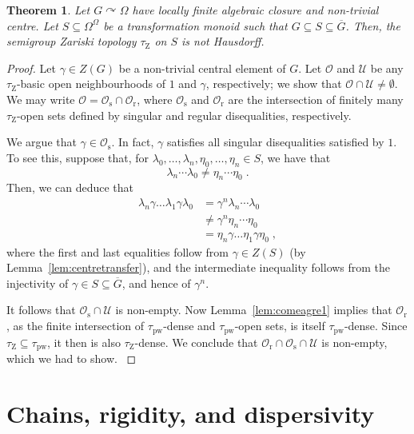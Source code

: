 \documentclass{article}
\newtheorem{theorem}{Theorem}[section]
\theoremstyle{remark}
\theoremstyle{definition}
\def\acts{\curvearrowright}
\def\G{\overline{G}}
\newcommand{\pw}[0]{\tau_{\mathrm{pw}}}
\newcommand{\zar}[0]{\tau_{\mathrm{Z}}}
\begin{document}
{{{{{\begin{theorem}\label{thm:zar} Let $G\acts \Omega$ have locally finite algebraic closure and non-trivial centre. Let $S\subseteq \Omega^\Omega$ be a transformation monoid such that $G\subseteq S\subseteq \G$. Then, the semigroup Zariski topology $\zar$ on $S$ is not Hausdorff.
\end{theorem}
\begin{proof} {Let $\gamma \in Z(G)$ be a non-trivial central element of $G$. Let $\mathcal{O}$ and $\mathcal{U}$ be any $\zar$-basic open neighbourhoods of $1$ and $\gamma$, respectively; we show that $\mathcal{O} \cap \mathcal{U} \neq \emptyset$. 
We may write $\mathcal{O} = \mathcal{O}_{\mathrm{s}} \cap \mathcal{O}_{\mathrm{r}}$, where $\mathcal{O}_{\mathrm{s}}$ and $\mathcal{O}_{\mathrm{r}}$ are the intersection of finitely many $\zar$-open sets defined by singular and regular disequalities, respectively.} %

{We  argue that $\gamma\in\mathcal{O}_{\mathrm{s}}$. In fact, $\gamma$ satisfies all singular disequalities
    satisfied by $1$. To see this, suppose that, for 
    {$\lambda_0, \dots, \lambda_n, \eta_0, \dots, \eta_n\in {S}$},
    we have that
    \[{\lambda_n\cdots \lambda_0\neq \eta_n\cdots \eta_0\;.}\]
    Then, we can deduce that}
    \begin{align*}
        \lambda_n\gamma\dots \lambda_1\gamma\lambda_0 &=\gamma^n\lambda_n\cdots \lambda_0\\
        &\neq \gamma^{n} \eta_n\cdots \eta_0\\
        &= \eta_n\gamma\dots \eta_1\gamma \eta_0\;,
    \end{align*}
{where the first and last equalities follow from $\gamma \in Z(S)$ (by Lemma~\ref{lem:centretransfer}), and the intermediate inequality follows from the injectivity of $\gamma\in S\subseteq\overline{G}$, and hence of $\gamma^{n}$.}

{It follows that $\mathcal{O}_{\mathrm{s}}\cap \mathcal{U}$ is non-empty. %
Now Lemma~\ref{lem:comeagre1} implies that $\mathcal{O}_{\mathrm{r}}$, as the finite intersection of $\pw$-dense and $\pw$-open sets, is itself $\pw$-dense. Since $\zar\subseteq \pw$, it then is also $\zar$-dense. We conclude that $\mathcal{O}_{\mathrm{r}}\cap \mathcal{O}_{\mathrm{s}}\cap \mathcal{U}$ is non-empty, which we had to show.  %
}
\end{proof}



\section{Chains, rigidity, and dispersivity}\label{sec:chains}

}}}}}
\end{document}

